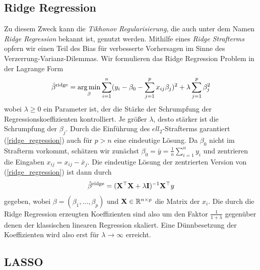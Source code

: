 \subsection{Ridge Regression}

Zu diesem Zweck kann die \textit{Tikhonov Regularisierung}, die auch unter dem Namen \textit{Ridge Regression} bekannt ist, genutzt werden. Mithilfe eines \textit{Ridge Strafterms} opfern wir einen Teil des Bias für verbesserte Vorhersagen im Sinne des Verzerrung-Varianz-Dilemmas. Wir formulieren das Ridge Regression Problem in der Lagrange Form
\begin{align}
\label{ridge_regression}
\hat{\beta}^{\text{ridge}} = \operatorname*{arg\,min}_{\beta} \sum_{i=1}^{n}(y_i - \beta_0 - \sum_{j=1}^p x_{ij}\beta_j)^2 + \lambda\sum_{j=1}^p \beta_j^2
\end{align}
wobei $\lambda \geq 0$ ein Parameter ist, der die Stärke der Schrumpfung der Regressionskoeffizienten kontrolliert. Je größer $\lambda$, desto stärker ist die Schrumpfung der $\beta_j$. Durch die Einführung des $ell_2$-Strafterms garantiert (\ref{ridge_regression}) auch für $p > n$ eine eindeutige Lösung. Da $\beta_0$ nicht im Strafterm vorkommt, schätzen wir zunächst $\beta_0 = \bar{y} = \frac{1}{n}\sum_{i=1}^{n} y_i$ und zentrieren die Eingaben $x_{ij} = x_{ij} - \bar{x}_j$. Die eindeutige Lösung der zentrierten Version von (\ref{ridge_regression}) ist dann durch
\begin{align}
\hat{\beta}^{\text{ridge}}  = (\mathbf{X}^{\top} \mathbf{X} + \lambda\mathbf{I})^{-1}\mathbf{X}^{\top}y
\end{align}
gegeben, wobei $\beta = (\beta_1, \ldots, \beta_p)$ und $\mathbf{X} \in \mathbb{R}^{n \times p}$ die Matrix der $x_i$. Die durch die Ridge Regression erzeugten Koeffizienten sind also um den Faktor $\frac{1}{1+\lambda}$ gegenüber denen der klassischen linearen Regression skaliert. Eine Dünnbesetzung der Koeffizienten wird also erst für $\lambda \to \infty$ erreicht.\\


\subsection{LASSO}
\label{lasso}

